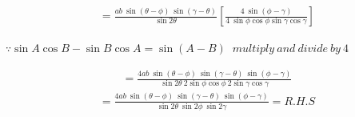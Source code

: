 \documentclass[journal,12pt,twocolumn]{IEEEtran}
\begin{document}
\vspace{0.3cm}
\begin{multline}
=\frac{ab~\sin(\theta-\phi)~\sin(\gamma-\theta)}{ \sin2\theta}\left[\frac{4~\sin(\phi-\gamma)}{4~\sin\phi\cos\phi\sin\gamma\cos\gamma}
\right]
\end{multline}
\begin{flushright}
$\because \sin A\cos B - \sin B\cos A = \sin(A-B)$
$~multiply ~and ~divide ~by ~4$
\end{flushright}

\vspace{0.3cm}
\begin{multline}
=\frac{4ab~\sin(\theta-\phi)~\sin(\gamma-\theta)~\sin(\phi-\gamma)}{ \sin2\theta~2\sin\phi\cos\phi~2\sin\gamma\cos\gamma}
\end{multline}
\vspace{0.3cm}
\begin{multline*}
=\frac{4ab~\sin(\theta-\phi)~\sin(\gamma-\theta)~\sin(\phi-\gamma)}{ \sin2\theta~\sin2\phi~\sin2\gamma} = R.H.S
\end{multline*}
\end{document}
